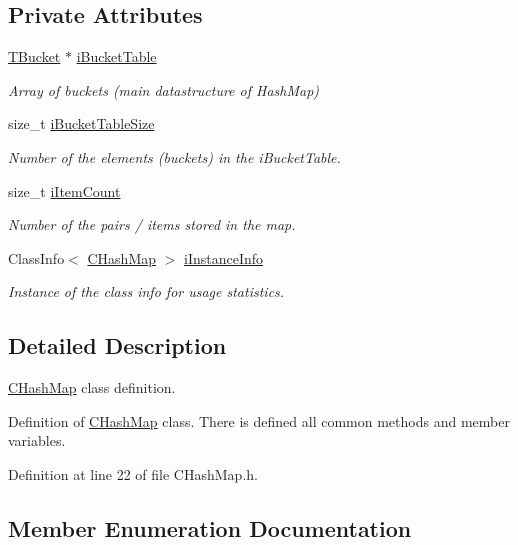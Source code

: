 \subsection*{Private Attributes}
\begin{DoxyCompactItemize}
\item 
\hyperlink{struct_c_hash_map_1_1_t_bucket}{T\+Bucket} $\ast$ \hyperlink{class_c_hash_map_a1018fdaad71e8207e747db26e88025d6}{i\+Bucket\+Table}
\begin{DoxyCompactList}\small\item\em Array of buckets (main datastructure of Hash\+Map) \end{DoxyCompactList}\item 
size\+\_\+t \hyperlink{class_c_hash_map_a8745c6aa08e235500828dea0ad30b548}{i\+Bucket\+Table\+Size}
\begin{DoxyCompactList}\small\item\em Number of the elements (buckets) in the {\ttfamily i\+Bucket\+Table}. \end{DoxyCompactList}\item 
size\+\_\+t \hyperlink{class_c_hash_map_aa1740c90e185ad56bf80632fc769c024}{i\+Item\+Count}
\begin{DoxyCompactList}\small\item\em Number of the pairs / items stored in the map. \end{DoxyCompactList}\item 
Class\+Info$<$ \hyperlink{class_c_hash_map}{C\+Hash\+Map} $>$ \hyperlink{class_c_hash_map_ae2e5e0311dc9a20f5a93c53a2fbfe9a2}{i\+Instance\+Info}
\begin{DoxyCompactList}\small\item\em Instance of the class info for usage statistics. \end{DoxyCompactList}\end{DoxyCompactItemize}


\subsection{Detailed Description}
\hyperlink{class_c_hash_map}{C\+Hash\+Map} class definition. 

Definition of \hyperlink{class_c_hash_map}{C\+Hash\+Map} class. There is defined all common methods and member variables. 

Definition at line 22 of file C\+Hash\+Map.\+h.



\subsection{Member Enumeration Documentation}
\mbox{\label{class_c_hash_map_a9c8b9ae56d510ae0ff5e9ba74ee9930d}} 
